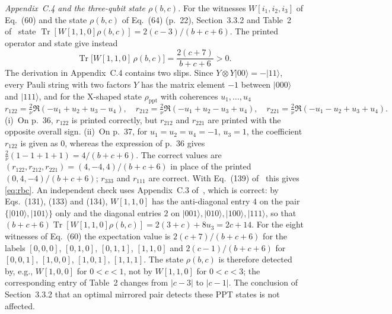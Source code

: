 \documentclass[10pt,a4paper]{article}
\newcommand{\ket}[1]{\lvert #1\rangle}
\newcommand{\tr}{\operatorname{Tr}}
\begin{document}
\emph{Appendix~C.4 and the three-qubit state $\rho(b,c)$.} For the witnesses
$W[i_1,i_2,i_3]$ of Eq.~(60) and the state $\rho(b,c)$ of Eq.~(64) (p.~22),
Section~3.3.2 and Table~2 of~\cite{SBHCB26} state
$\tr[W[1,1,0]\rho(b,c)]=2(c-3)/(b+c+6)$. The printed operator and state give instead
\begin{equation}\label{eq:rbc}
\tr\bigl[W[1,1,0]\,\rho(b,c)\bigr]=\frac{2(c+7)}{b+c+6}>0 .
\end{equation}
The derivation in Appendix~C.4 contains two slips. Since
$Y\otimes Y\ket{00}=-\ket{11}$, every Pauli string with two factors $Y$ has the matrix
element $-1$ between $\ket{000}$ and $\ket{111}$, and for the X-shaped state
$\rho_{\mathrm{ppt}}$ with coherences $u_1,\dots,u_4$
\begin{equation}\label{eq:rexact}
r_{122}=\tfrac{2}{\nu}\Re(-u_1+u_2+u_3-u_4),\quad
r_{212}=\tfrac{2}{\nu}\Re(-u_1+u_2-u_3+u_4),\quad
r_{221}=\tfrac{2}{\nu}\Re(-u_1-u_2+u_3+u_4).
\end{equation}
(i)~On p.~36, $r_{122}$ is printed correctly, but $r_{212}$ and $r_{221}$ are printed
with the opposite overall sign. (ii)~On p.~37, for $u_1=u_2=u_4=-1$, $u_3=1$, the
coefficient $r_{122}$ is given as $0$, whereas the expression of p.~36 gives
$\tfrac2\nu(1-1+1+1)=4/(b+c+6)$. The correct values are
$(r_{122},r_{212},r_{221})=(4,-4,4)/(b+c+6)$ in place of the printed $(0,4,-4)/(b+c+6)$;
$r_{333}$ and $r_{111}$ are correct. With Eq.~(139) of~\cite{SBHCB26} this gives
\eqref{eq:rbc}. An independent check uses Appendix~C.3 of~\cite{SBHCB26}, which is
correct: by Eqs.~(131), (133) and (134), $W[1,1,0]$ has the anti-diagonal entry $4$ on the
pair $\{\ket{010},\ket{101}\}$ only and the diagonal entries $2$ on
$\ket{001},\ket{010},\ket{100},\ket{111}$, so that
$(b+c+6)\tr[W[1,1,0]\rho(b,c)]=2(3+c)+8u_3=2c+14$. For the eight witnesses of Eq.~(60) the
expectation value is $2(c+7)/(b+c+6)$ for the labels $[0,0,0]$, $[0,1,0]$, $[0,1,1]$,
$[1,1,0]$ and $2(c-1)/(b+c+6)$ for $[0,0,1]$, $[1,0,0]$, $[1,0,1]$, $[1,1,1]$. The state
$\rho(b,c)$ is therefore detected by, e.g., $W[1,0,0]$ for $0<c<1$, not by $W[1,1,0]$ for
$0<c<3$; the corresponding entry of Table~2 changes from $|c-3|$ to $|c-1|$. The
conclusion of Section~3.3.2 that an optimal mirrored pair detects these PPT states is not
affected.
\end{document}
